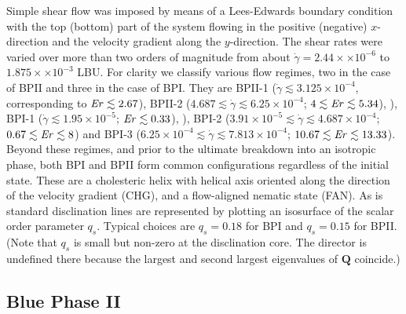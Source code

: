\documentclass[8.5pt,twoside,twocolumn]{article}
\newcommand{\e}[1]{\times10^{#1}}
\newcommand{\gd}{\dot{\gamma}}
\begin{document}
Simple shear flow was imposed by means of a Lees-Edwards boundary condition ~\cite{Wagner:2002} with
the top (bottom) part of the system flowing in the positive (negative) $x$-direction and the 
velocity gradient along the $y$-direction.
The shear rates were varied over more than two orders of magnitude from about 
$\gd=2.44\times \e{-6}$ to $1.875\times\e{-3}$ LBU.
For clarity we classify various flow regimes, two in the case of BPII and three in the 
case of BPI. 
They are BPII-1 ($\gd \lesssim 3.125\e{-4}$, corresponding to ${\it Er} \lesssim 2.67$), 
BPII-2 ($4.687\lesssim \gd\lesssim 6.25\e{-4}$; $4\lesssim {\it Er} \lesssim 5.34$), ),
BPI-1 ($\gd \lesssim 1.95\e{-5}$; ${\it Er} \lesssim 0.33$), ), BPI-2 ($3.91\e{-5}\lesssim \gd \lesssim 4.687\e{-4}$; $0.67\lesssim {\it Er} \lesssim 8$) and BPI-3 ($6.25\e{-4}\lesssim \gd\lesssim 7.813\e{-4}$; $10.67 \lesssim {\it Er} \lesssim 13.33$).
Beyond these regimes, and prior to the ultimate breakdown into an isotropic phase, 
both BPI and BPII form common configurations regardless 
of the initial state. These are a cholesteric helix with helical axis 
oriented along the direction of the velocity gradient (CHG), 
and a flow-aligned nematic state (FAN).  
As is standard \cite{Henrich:2010b,Henrich:2012b} disclination lines are represented by plotting an isosurface of the scalar order parameter $q_s$. 
Typical choices are $q_s=0.18$ for BPI and $q_s=0.15$ for BPII.
(Note that $q_s$ is small but non-zero at the disclination core. The director is undefined there because the largest and second largest eigenvalues of ${\mathbf Q}$ coincide.)

\subsection{Blue Phase II}
\end{document}
